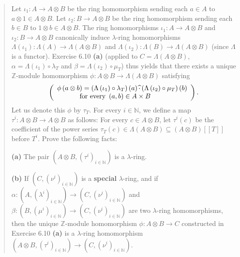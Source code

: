 \documentclass[numbers=enddot,12pt,final,onecolumn,notitlepage]{scrartcl}%
\begin{document}
\begin{quotation}
Let $\iota_{1}:A\rightarrow A\otimes B$ be the ring homomorphism sending each
$a\in A$ to $a\otimes1\in A\otimes B$. Let $\iota_{2}:B\rightarrow A\otimes B$
be the ring homomorphism sending each $b\in B$ to $1\otimes b\in A\otimes B$.
The ring homomorphisms $\iota_{1}:A\rightarrow A\otimes B$ and $\iota
_{2}:B\rightarrow A\otimes B$ canonically induce $\lambda$-ring homomorphisms
$\Lambda\left(  \iota_{1}\right)  :\Lambda\left(  A\right)  \rightarrow
\Lambda\left(  A\otimes B\right)  $ and $\Lambda\left(  \iota_{2}\right)
:\Lambda\left(  B\right)  \rightarrow\Lambda\left(  A\otimes B\right)  $
(since $\Lambda$ is a functor). Exercise 6.10 \textbf{(a)} (applied to
$C=\Lambda\left(  A\otimes B\right)  $, $\alpha=\Lambda\left(  \iota
_{1}\right)  \circ\lambda_{T}$ and $\beta=\Lambda\left(  \iota_{2}\right)
\circ\mu_{T}$) thus yields that there exists a unique $\mathbb{Z}$-module
homomorphism $\phi:A\otimes B\rightarrow\Lambda\left(  A\otimes B\right)  $
satisfying%
\[
\left(
\begin{array}
[c]{l}%
\phi\left(  a\otimes b\right)  =\left(  \Lambda\left(  \iota_{1}\right)
\circ\lambda_{T}\right)  \left(  a\right)  \widehat{\cdot}\left(
\Lambda\left(  \iota_{2}\right)  \circ\mu_{T}\right)  \left(  b\right) \\
\ \ \ \ \ \ \ \ \ \ \text{for every }\left(  a,b\right)  \in A\times B
\end{array}
\right)  .
\]
Let us denote this $\phi$ by $\tau_{T}$. For every $i\in\mathbb{N}$, we define
a map $\tau^{i}:A\otimes B\rightarrow A\otimes B$ as follows: For every $c\in
A\otimes B$, let $\tau^{i}\left(  c\right)  $ be the coefficient of the power
series $\tau_{T}\left(  c\right)  \in\Lambda\left(  A\otimes B\right)
\subseteq\left(  A\otimes B\right)  \left[  \left[  T\right]  \right]  $
before $T^{i}$. Prove the following facts:

\textbf{(a)} The pair $\left(  A\otimes B,\left(  \tau^{i}\right)
_{i\in\mathbb{N}}\right)  $ is a $\lambda$-ring.

\textbf{(b)} If $\left(  C,\left(  \nu^{i}\right)  _{i\in\mathbb{N}}\right)  $
is a \textbf{special} $\lambda$-ring, and if $\alpha:\left(  A,\left(
\lambda^{i}\right)  _{i\in\mathbb{N}}\right)  \rightarrow\left(  C,\left(
\nu^{i}\right)  _{i\in\mathbb{N}}\right)  $ and $\beta:\left(  B,\left(
\mu^{i}\right)  _{i\in\mathbb{N}}\right)  \rightarrow\left(  C,\left(  \nu
^{i}\right)  _{i\in\mathbb{N}}\right)  $ are two $\lambda$-ring homomorphisms,
then the unique $\mathbb{Z}$-module homomorphism $\phi:A\otimes B\rightarrow
C$ constructed in Exercise 6.10 \textbf{(a)} is a $\lambda$-ring homomorphism
$\left(  A\otimes B,\left(  \tau^{i}\right)  _{i\in\mathbb{N}}\right)
\rightarrow\left(  C,\left(  \nu^{i}\right)  _{i\in\mathbb{N}}\right)  $.


\end{quotation}
\end{document}
